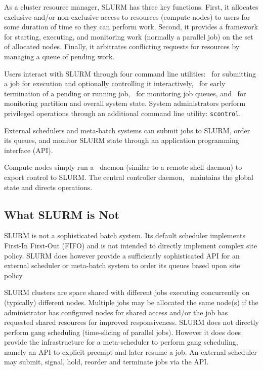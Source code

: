As a cluster resource manager, SLURM has three key functions.  First,
it allocates exclusive and/or non-exclusive access to resources (compute nodes)
to users for 
some duration of time so they can perform work.  Second, it provides 
a framework for starting, executing, and monitoring work (normally a 
parallel job) on the set of allocated nodes.  Finally, it arbitrates 
conflicting requests for resources by managing a queue of pending work.

Users interact with SLURM through four command line utilities: 
\srun\ for submitting a job for execution and optionally controlling it
interactively, 
\scancel\ for early termination of a pending or running job, 
\squeue\ for monitoring job queues, and 
\sinfo\ for monitoring partition and overall system state.
System administrators perform privileged operations through an additional
command line utility: {\tt scontrol}.

External schedulers and meta-batch systems can submit jobs to SLURM, 
order its queues, and monitor SLURM state through an application 
programming interface (API).

Compute nodes simply run a \slurmd\ daemon (similar to a remote shell 
daemon) to export control to SLURM.  The central controller daemon,
\slurmctld\, maintains the global state and directs operations.

\subsection{What SLURM is Not}

SLURM is not a sophisticated batch system.  Its default scheduler
implements First-In First-Out (FIFO) and is not 
intended to directly implement complex site policy.
SLURM does however provide a sufficiently sophisticated API for an external 
scheduler or meta-batch system to order its queues based upon site policy.

SLURM clusters are space shared with different jobs executing 
concurrently on (typically) different nodes. 
Multiple jobs may be allocated the same node(s) 
if the administrator has configured nodes for shared access and/or 
the job has requested shared resources for improved responsiveness.
SLURM does not directly perform gang scheduling (time-slicing 
of parallel jobs). However it does does provide the infrastructure 
for a meta-scheduler to perform gang scheduling, namely an API 
to explicit preempt and later resume a job.
An external scheduler may submit, signal, hold, 
reorder and terminate jobs via the API.

